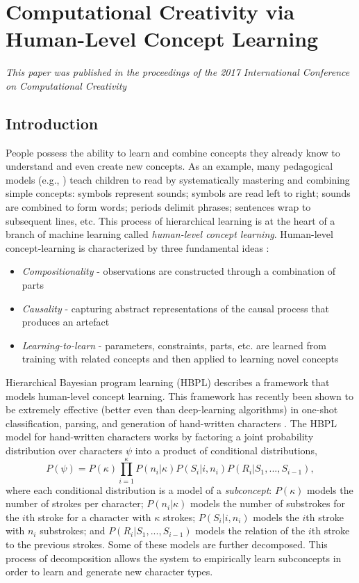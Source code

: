 \documentclass[phd,electronic,oneside,twosidetoc,letterpaper,chaptercenter,parttop,lof,lot]{byumsphd}
\begin{document}
\chapter{Computational Creativity via Human-Level Concept Learning}

\emph{This paper was published in the proceedings of the 2017 International Conference on Computational Creativity}

\section{Introduction}

People possess the ability to learn and combine concepts they already know to understand and even create new concepts. As an example, many pedagogical models (e.g., \cite{englemann1974distar}) teach children to read by systematically mastering and combining simple concepts: symbols represent sounds; symbols are read left to right; sounds are combined to form words; periods delimit phrases; sentences wrap to subsequent lines, etc. This process of hierarchical learning is at the heart of a branch of machine learning called \textit{human-level concept learning}. Human-level concept-learning is characterized by three fundamental ideas \cite{Lake2015}:

\begin{itemize}  
\item \emph{Compositionality} - observations are constructed through a combination of parts
\item \emph{Causality} - capturing abstract representations of the causal process that produces an artefact
\item \emph{Learning-to-learn} - parameters, constraints, parts, etc. are learned from training with related concepts and then applied to learning novel concepts
\end{itemize}

Hierarchical Bayesian program learning (HBPL) describes a framework that models human-level concept learning. This framework has recently been shown to be extremely effective (better even than deep-learning algorithms) in one-shot classification, parsing, and generation of hand-written characters \cite{Lake2015}. The HBPL model for hand-written characters works by factoring a joint probability distribution over characters $\psi$ into a product of conditional distributions,
\small
\begin{equation} \label{eq:1}
P(\psi) = P(\kappa) \prod_{i=1}^{\kappa} P(n_i|\kappa)P(S_i|i,n_i)P(R_i|S_1, ..., S_{i-1}),
\end{equation}
\normalsize
\noindent where each conditional distribution is a model of a \textit{subconcept}: \( P(\kappa) \) models the number of strokes per character; \( P(n_i|\kappa) \) models the number of substrokes for the $i$th stroke for a character with $\kappa$ strokes; \( P(S_i|i,n_i) \) models the $i$th stroke with $n_i$ substrokes; and \( P(R_i|S_1, ..., S_{i-1}) \) models the relation of the $i$th stroke to the previous strokes. Some of these models are further decomposed. This process of decomposition allows the system to empirically learn subconcepts in order to learn and generate new character types.
\end{document}
